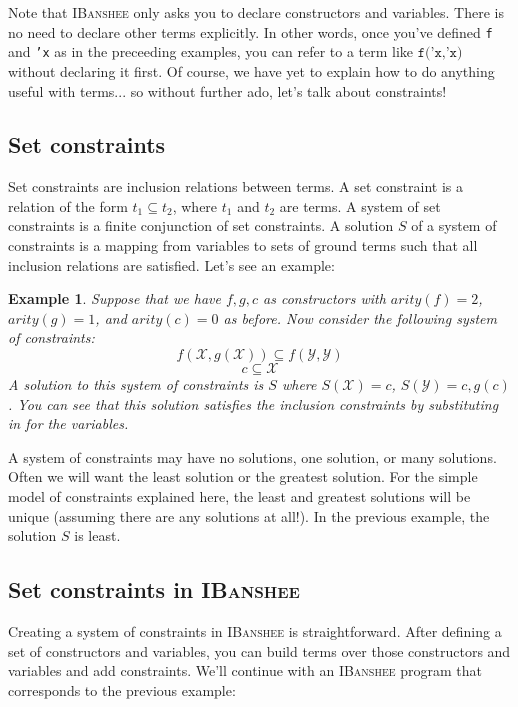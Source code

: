 \documentclass{article}
\newcommand{\ibanshee}{\textsc{IBanshee}}
\newcommand{\var}[1]{\mathcal{#1}}
\newtheorem{example}{Example}
\begin{document}
Note that \ibanshee{} only asks you to declare constructors and
variables. There is no need to declare other terms explicitly. In
other words, once you've defined \texttt{f} and \texttt{'x} as in the
preceeding examples, you can refer to a term like $\texttt{f('x,'x)}$
without declaring it first. Of course, we have yet to explain how to
do anything useful with terms... so without further ado, let's talk
about constraints!

\subsection{Set constraints}

Set constraints are inclusion relations between terms. A set
constraint is a relation of the form $t_1 \subseteq t_2$, where $t_1$
and $t_2$ are terms. A system of set constraints is a finite
conjunction of set constraints. A solution $S$ of a system of
constraints is a mapping from variables to sets of ground terms such
that all inclusion relations are satisfied. Let's see an example:

\begin{example}
Suppose that we have $f,g,c$ as constructors with $arity(f) = 2$,
$arity(g) = 1$, and $arity(c) = 0$ as before. Now consider the
following system of constraints:
\[
f(\var{X},g(\var{X})) \subseteq f(\var{Y},\var{Y})
\]
\[
c \subseteq \var{X}
\]
A solution to this system of constraints is $S$ where $S(\var{X}) =
{c}$, $S(\var{Y}) = {c,g(c)}$. You can see that this solution
satisfies the inclusion constraints by substituting in for the
variables.
\end{example}

A system of constraints may have no solutions, one solution, or many
solutions. Often we will want the least solution or the greatest
solution. For the simple model of constraints explained here, the
least and greatest solutions will be unique (assuming there are any
solutions at all!). In the previous example, the solution $S$ is
least.

\subsection{Set constraints in \ibanshee{}}

Creating a system of constraints in \ibanshee{} is
straightforward. After defining a set of constructors and variables,
you can build terms over those constructors and variables and add
constraints. We'll continue with an \ibanshee{} program that
corresponds to the previous example:
\end{document}
